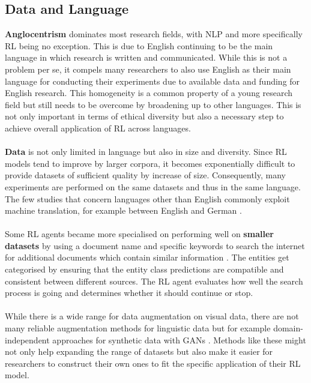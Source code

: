 \documentclass[11pt,a4paper]{article}
\begin{document}
\subsection{Data and Language}
\textbf{Anglocentrism} dominates most research fields, with NLP and more specifically RL being no exception. This is due to English continuing to be the main language in which research is written and communicated. While this is not a problem per se, it compels many researchers to also use English as their main language for conducting their experiments due to available data and funding for English research. This homogeneity is a common property of a young research field but still needs to be overcome by broadening up to other languages. This is not only important in terms of ethical diversity but also a necessary step to achieve overall application of RL across languages. \\\\
\textbf{Data} is not only limited in language but also in size and diversity. Since RL models tend to improve by larger corpora, it becomes exponentially difficult to provide datasets of sufficient quality by increase of size. Consequently, many experiments are performed on the same datasets and thus in the same language. The few studies that concern languages other than English commonly exploit machine translation, for example between English and German \citet{yasui-etal-2019}. \\\\
Some RL agents became more specialised on performing well on \textbf{smaller datasets} by using a document name and specific keywords to search the internet for additional documents which contain similar information \citep{narasimhan-etal-2016-improving}. The entities get categorised by ensuring that the entity class predictions are compatible and consistent between different sources. The RL agent evaluates how well the search process is going and determines whether it should continue or stop.\\\\
While there is a wide range for data augmentation on visual data, there are not many reliable augmentation methods for linguistic data but for example domain-independent approaches for synthetic data with GANs \citep{yoon-2018-pategan}. Methods like these might not only help expanding the range of datasets but also make it easier for researchers to construct their own ones to fit the specific application of their RL model.\\\\
\end{document}
